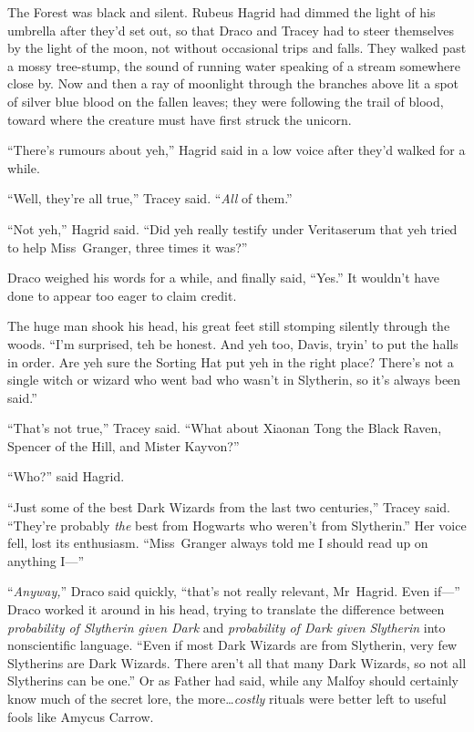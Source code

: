 The Forest was black and silent. Rubeus Hagrid had dimmed the light of his umbrella after they’d set out, so that Draco and Tracey had to steer themselves by the light of the moon, not without occasional trips and falls. They walked past a mossy tree-stump, the sound of running water speaking of a stream somewhere close by. Now and then a ray of moonlight through the branches above lit a spot of silver blue blood on the fallen leaves; they were following the trail of blood, toward where the creature must have first struck the unicorn.

“There’s rumours about yeh,” Hagrid said in a low voice after they’d walked for a while.

“Well, they’re all true,” Tracey said. “\emph{All} of them.”

“Not yeh,” Hagrid said. “Did yeh really testify under Veritaserum that yeh tried to help Miss~Granger, three times it was?”

Draco weighed his words for a while, and finally said, “Yes.” It wouldn’t have done to appear too eager to claim credit.

The huge man shook his head, his great feet still stomping silently through the woods. “I’m surprised, teh be honest. And yeh too, Davis, tryin’ to put the halls in order. Are yeh sure the Sorting Hat put yeh in the right place? There’s not a single witch or wizard who went bad who wasn’t in Slytherin, so it’s always been said.”

“That’s not true,” Tracey said. “What about Xiaonan Tong the Black Raven, Spencer of the Hill, and Mister Kayvon?”

“Who?” said Hagrid.

“Just some of the best Dark Wizards from the last two centuries,” Tracey said. “They’re probably \emph{the} best from Hogwarts who weren’t from Slytherin.” Her voice fell, lost its enthusiasm. “Miss~Granger always told me I should read up on anything I—”

“\emph{Anyway,}” Draco said quickly, “that’s not really relevant, Mr~Hagrid. Even if—” Draco worked it around in his head, trying to translate the difference between \emph{probability of Slytherin given Dark} and \emph{probability of Dark given Slytherin} into nonscientific language. “Even if most Dark Wizards are from Slytherin, very few Slytherins are Dark Wizards. There aren’t all that many Dark Wizards, so not all Slytherins can be one.” Or as Father had said, while any Malfoy should certainly know much of the secret lore, the more…\emph{costly} rituals were better left to useful fools like Amycus Carrow.

